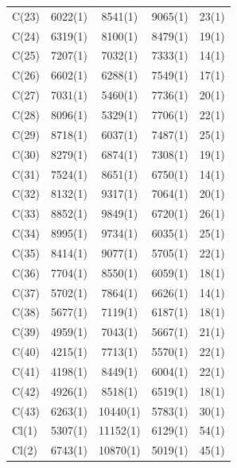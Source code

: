 \begin{center}
{\begin{supertabular}{lcccc}
C(23)&6022(1)&8541(1)&9065(1)&23(1)\\
C(24)&6319(1)&8100(1)&8479(1)&19(1)\\
C(25)&7207(1)&7032(1)&7333(1)&14(1)\\
C(26)&6602(1)&6288(1)&7549(1)&17(1)\\
C(27)&7031(1)&5460(1)&7736(1)&20(1)\\
C(28)&8096(1)&5329(1)&7706(1)&22(1)\\
C(29)&8718(1)&6037(1)&7487(1)&25(1)\\
C(30)&8279(1)&6874(1)&7308(1)&19(1)\\
C(31)&7524(1)&8651(1)&6750(1)&14(1)\\
C(32)&8132(1)&9317(1)&7064(1)&20(1)\\
C(33)&8852(1)&9849(1)&6720(1)&26(1)\\
C(34)&8995(1)&9734(1)&6035(1)&25(1)\\
C(35)&8414(1)&9077(1)&5705(1)&22(1)\\
C(36)&7704(1)&8550(1)&6059(1)&18(1)\\
C(37)&5702(1)&7864(1)&6626(1)&14(1)\\
C(38)&5677(1)&7119(1)&6187(1)&18(1)\\
C(39)&4959(1)&7043(1)&5667(1)&21(1)\\
C(40)&4215(1)&7713(1)&5570(1)&22(1)\\
C(41)&4198(1)&8449(1)&6004(1)&22(1)\\
C(42)&4926(1)&8518(1)&6519(1)&18(1)\\
C(43)&6263(1)&10440(1)&5783(1)&30(1)\\
Cl(1)&5307(1)&11152(1)&6129(1)&54(1)\\
Cl(2)&6743(1)&10870(1)&5019(1)&45(1)\\
\end{supertabular}
}
\end{center}


